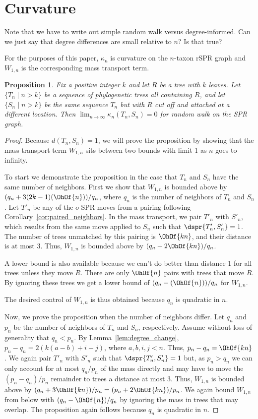 \documentclass{amsart}
\newtheorem{proposition}[theorem]{Proposition}
\begin{document}
\section{Curvature}
Note that we have to write out simple random walk versus degree-informed.
Can we just say that degree differences are small relative to $n$? Is that true?

For the purposes of this paper, $\kappa_n$ is curvature on the $n$-taxon rSPR graph and $W_{1,n}$ is the corresponding mass transport term.

\begin{proposition}
Fix a positive integer $k$ and let $R$ be a tree with $k$ leaves.
Let $\{T_n \mid n > k\}$ be a sequence of phylogenetic trees all containing $R$, and let $\{S_n \mid n > k\}$ be the same sequence $T_n$ but with $R$ cut off and attached at a different location.
Then $\lim_{n \rightarrow \infty} \kappa_n(T_n, S_n) = 0$ for  random walk on the SPR graph.
\end{proposition}
\begin{proof}
Because $d(T_n, S_n) = 1$, we will prove the proposition by showing that the mass transport term $W_{1,n}$ sits between two bounds with limit 1 as $n$ goes to infinity.

To start we demonstrate the proposition in the case that $T_n$ and $S_n$ have the same number of neighbors.
First we show that $W_{1,n}$ is bounded above by $(q_n+3(2k-1)(\OhOf{n}))/q_n$, where $q_n$ is the number of neighbors of $T_n$ and $S_n$.
Let $T'_n$ be any of the $o$ SPR moves from a pairing following Corollary~\ref{cor:paired_neighbors}.
In the mass transport, we pair $T'_n$ with $S'_n$, which results from the same move applied to $S_n$ such that $\dspr{T'_n, S'_n} = 1$.
The number of trees unmatched by this pairing is $\OhOf{kn}$, and their distance is at most 3.
Thus, $W_{1,n}$ is bounded above by $(q_n + 2\OhOf{kn}) / q_n$.

A lower bound is also available because we can't do better than distance 1 for all trees unless they move $R$.
There are only $\OhOf{n}$ pairs with trees that move $R$.
By ignoring these trees we get a lower bound of $(q_n -(\OhOf{n}))/q_n$ for $W_{1,n}$.

The desired control of $W_{1,n}$ is thus obtained because $q_n$ is quadratic in $n$.

Now, we prove the proposition when the number of neighbors differ.
Let $q_n$ and $p_n$ be the number of neighbors of $T_n$ and $S_n$, respectively.
Assume without loss of generality that $q_n < p_n$.
By Lemma~\ref{lem:degree_change}, $p_n - q_n = 2(k(a-b) + i - j)$, where $a,b,i,j < n$.
Thus, $p_n - q_n = \OhOf{kn}$.
We again pair $T'_n$ with $S'_n$ such that $\dspr{T'_n, S'_n}=1$ but, as $p_n > q_n$ we can only account for at most $q_n / p_n$ of the mass directly and may have to move the $(p_n - q_n) / p_n$ remainder to trees a distance at most 3.
Thus, $W_{1,n}$ is bounded above by $(q_n + 3\OhOf{kn}) / p_n = (p_n + 2\OhOf{kn}) / p_n$.
We again bound $W_{1,n}$ from below with $(q_n - \OhOf{n}) / q_n$ by ignoring the mass in trees that may overlap.
The proposition again follows because $q_n$ is quadratic in $n$.

\end{proof}
\end{document}
